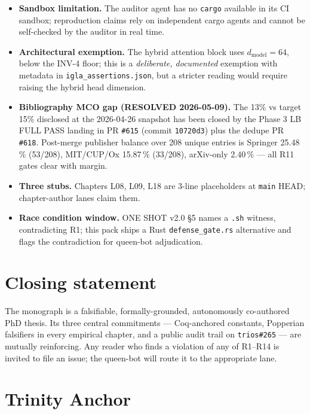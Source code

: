 \begin{itemize}
  \item \textbf{Sandbox limitation.} The auditor agent has no \texttt{cargo}
    available in its CI sandbox; reproduction claims rely on independent
    cargo agents and cannot be self-checked by the auditor in real time.
  \item \textbf{Architectural exemption.} The hybrid attention block uses
    $d_{\mathrm{model}}\!=\!64$, below the INV-4 floor; this is a
    \emph{deliberate, documented} exemption with metadata in
    \texttt{igla\_assertions.json}, but a stricter reading would require
    raising the hybrid head dimension.
  \item \textbf{Bibliography MCO gap (RESOLVED 2026-05-09).} The 13\% vs
    target 15\% disclosed at the 2026-04-26 snapshot has been closed by
    the Phase 3 LB FULL PASS landing in PR \texttt{\#615} (commit
    \texttt{10720d3}) plus the dedupe PR \texttt{\#618}. Post-merge
    publisher balance over 208 unique entries is
    Springer 25.48\,\% (53/208), MIT/CUP/Ox 15.87\,\% (33/208),
    arXiv-only 2.40\,\% — all R11 gates clear with margin.
  \item \textbf{Three stubs.} Chapters L08, L09, L18 are 3-line
    placeholders at \texttt{main} HEAD; chapter-author lanes claim them.
  \item \textbf{Race condition window.} ONE SHOT v2.0 §5 names a
    \texttt{.sh} witness, contradicting R1; this pack ships a Rust
    \texttt{defense\_gate.rs} alternative and flags the contradiction for
    queen-bot adjudication.
\end{itemize}

\section{Closing statement}

The monograph is a falsifiable, formally-grounded, autonomously
co-authored PhD thesis. Its three central commitments — Coq-anchored
constants, Popperian falsifiers in every empirical chapter, and a public
audit trail on \texttt{trios\#265} — are mutually reinforcing. Any reader
who finds a violation of any of R1--R14 is invited to file an issue; the
queen-bot will route it to the appropriate lane.

\section{Trinity Anchor}

